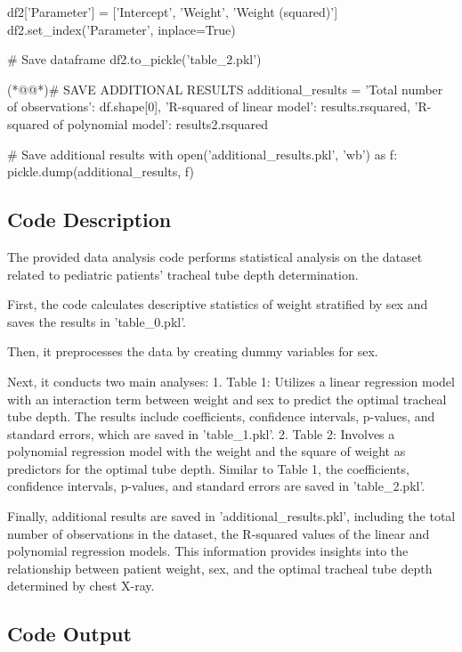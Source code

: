 \documentclass[11pt]{article}
\begin{document}
\begin{python}
df2['Parameter'] = ['Intercept', 'Weight', 'Weight (squared)']
df2.set_index('Parameter', inplace=True)

# Save dataframe
df2.to_pickle('table_2.pkl')

(*@@*)# SAVE ADDITIONAL RESULTS
additional_results = {
    'Total number of observations': df.shape[0],
    'R-squared of linear model': results.rsquared,
    'R-squared of polynomial model': results2.rsquared
}

# Save additional results
with open('additional_results.pkl', 'wb') as f:
    pickle.dump(additional_results, f)

\end{python}

\subsection{Code Description}

The provided data analysis code performs statistical analysis on the dataset related to pediatric patients' tracheal tube depth determination. 

First, the code calculates descriptive statistics of weight stratified by sex and saves the results in 'table\_0.pkl'. 

Then, it preprocesses the data by creating dummy variables for sex. 

Next, it conducts two main analyses:
1. Table 1: Utilizes a linear regression model with an interaction term between weight and sex to predict the optimal tracheal tube depth. The results include coefficients, confidence intervals, p-values, and standard errors, which are saved in 'table\_1.pkl'. 
2. Table 2: Involves a polynomial regression model with the weight and the square of weight as predictors for the optimal tube depth. Similar to Table 1, the coefficients, confidence intervals, p-values, and standard errors are saved in 'table\_2.pkl'. 

Finally, additional results are saved in 'additional\_results.pkl', including the total number of observations in the dataset, the R-squared values of the linear and polynomial regression models. This information provides insights into the relationship between patient weight, sex, and the optimal tracheal tube depth determined by chest X-ray.

\subsection{Code Output}\hypertarget{file-table-0-pkl}{}
\end{document}
